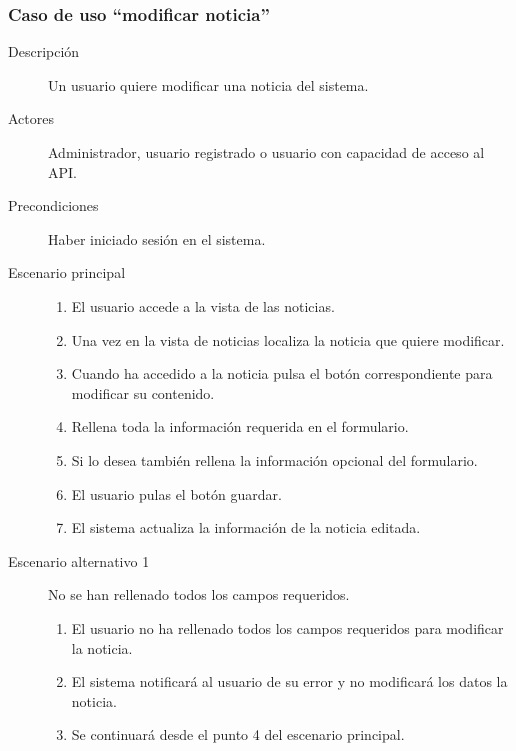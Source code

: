 \subsubsection{Caso de uso ``modificar noticia''}
\begin{description}
\item[Descripción]  Un usuario quiere modificar una noticia del sistema.
\item[Actores]  Administrador, usuario registrado o usuario con capacidad de acceso al API.
\item[Precondiciones]  Haber iniciado sesión en el sistema.
\item[Escenario principal]	\hfill
							\begin{enumerate}
							\item El usuario accede a la vista de las noticias.
							\item Una vez en la vista de noticias localiza la noticia que quiere modificar.
							\item Cuando ha accedido a la noticia pulsa el botón correspondiente para modificar su contenido.
							\item Rellena toda la información requerida en el formulario.
							\item Si lo desea también rellena la información opcional del formulario.
							\item El usuario pulas el botón guardar.
							\item El sistema actualiza la información de la noticia editada.
							\end{enumerate}
\item[Escenario alternativo 1] No se han rellenado todos los campos requeridos.
							\begin{enumerate}
							\item El usuario no ha rellenado todos los campos requeridos para modificar la noticia.
							\item El sistema notificará al usuario de su error y no modificará los datos la noticia.
							\item Se continuará desde el punto 4 del escenario principal.
							\end{enumerate}
\end{description}


